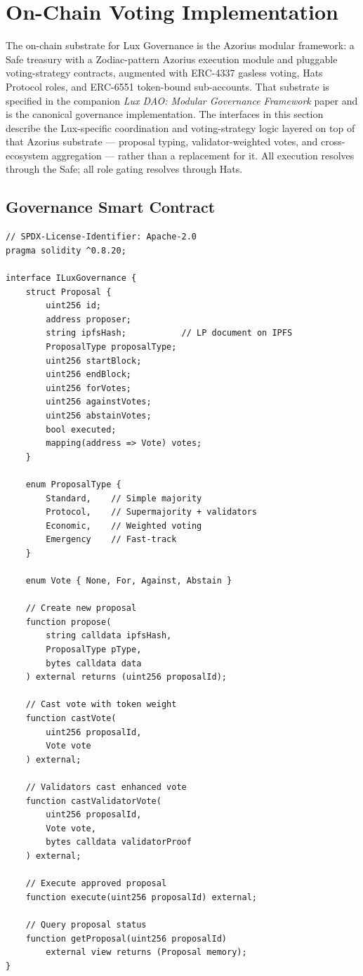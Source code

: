 \section{On-Chain Voting Implementation}


The on-chain substrate for Lux Governance is the Azorius modular framework: a
Safe treasury with a Zodiac-pattern Azorius execution module and pluggable
voting-strategy contracts, augmented with ERC-4337 gasless voting, Hats Protocol
roles, and ERC-6551 token-bound sub-accounts. That substrate is specified in the
companion \emph{Lux DAO: Modular Governance Framework} paper and is the canonical
governance implementation. The interfaces in this section describe the
Lux-specific coordination and voting-strategy logic layered on top of that
Azorius substrate --- proposal typing, validator-weighted votes, and
cross-ecosystem aggregation --- rather than a replacement for it. All execution
resolves through the Safe; all role gating resolves through Hats.


\subsection{Governance Smart Contract}

\begin{lstlisting}[language=Solidity,caption=Core governance contract interface]
// SPDX-License-Identifier: Apache-2.0
pragma solidity ^0.8.20;

interface ILuxGovernance {
    struct Proposal {
        uint256 id;
        address proposer;
        string ipfsHash;           // LP document on IPFS
        ProposalType proposalType;
        uint256 startBlock;
        uint256 endBlock;
        uint256 forVotes;
        uint256 againstVotes;
        uint256 abstainVotes;
        bool executed;
        mapping(address => Vote) votes;
    }

    enum ProposalType {
        Standard,    // Simple majority
        Protocol,    // Supermajority + validators
        Economic,    // Weighted voting
        Emergency    // Fast-track
    }

    enum Vote { None, For, Against, Abstain }

    // Create new proposal
    function propose(
        string calldata ipfsHash,
        ProposalType pType,
        bytes calldata data
    ) external returns (uint256 proposalId);

    // Cast vote with token weight
    function castVote(
        uint256 proposalId,
        Vote vote
    ) external;

    // Validators cast enhanced vote
    function castValidatorVote(
        uint256 proposalId,
        Vote vote,
        bytes calldata validatorProof
    ) external;

    // Execute approved proposal
    function execute(uint256 proposalId) external;

    // Query proposal status
    function getProposal(uint256 proposalId)
        external view returns (Proposal memory);
}
\end{lstlisting}

